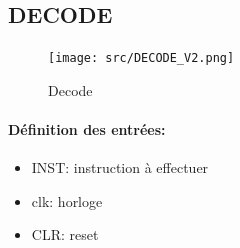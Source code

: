 \documentclass[a4paper]{article} %
\begin{document}
\subsection{DECODE}
\begin{figure}[H]
    \centering
    \texttt{[image: src/DECODE\_V2.png]}
    \caption{Decode}
    \label{decode_img}
\end{figure}

\paragraph{Définition des entrées:}
\begin{itemize}
    \item     INST: instruction à effectuer
    \item     clk: horloge
    \item     CLR: reset
\end{itemize}
\end{document}
